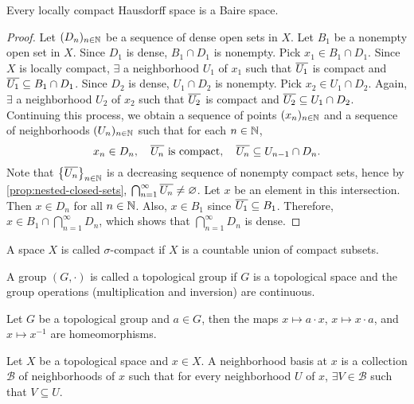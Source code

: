 \begin{thm}
    Every locally compact Hausdorff space is a Baire space.
    \begin{proof}
        Let $(D_n)_{n\in \N}$ be a sequence of dense open sets in $X$. Let $B_1$ be a nonempty open set in $X$. Since $D_1$ is dense, $B_1 \cap D_1$ is nonempty. Pick $x_1 \in B_1 \cap D_1$. Since $X$ is locally compact, $\exists$ a neighborhood $U_1$ of $x_1$ such that $\Bar{U_1}$ is compact and $\Bar{U_1} \subseteq B_1 \cap D_1$. Since $D_2$ is dense, $U_1 \cap D_2$ is nonempty. Pick $x_2 \in U_1 \cap D_2$. Again, $\exists$ a neighborhood $U_2$ of $x_2$ such that $\Bar{U_2}$ is compact and $\Bar{U_2} \subseteq U_1 \cap D_2$. Continuing this process, we obtain a sequence of points $(x_n)_{n\in \N}$ and a sequence of neighborhoods $(U_n)_{n\in \N}$ such that for each $n\in \N$,
        \[
        x_n \in D_n, \quad \Bar{U_n} \text{ is compact}, \quad \Bar{U_n} \subseteq U_{n-1} \cap D_n.
        \]
        Note that $\set{\Bar{U_n}}_{n\in \N}$ is a decreasing sequence of nonempty compact sets, hence by \ref{prop:nested-closed-sets}, $\bigcap_{n=1}^\infty \Bar{U_n} \neq \emptyset$. Let $x$ be an element in this intersection. Then $x \in D_n$ for all $n\in \N$. Also, $x \in B_1$ since $\Bar{U_1} \subseteq B_1$. Therefore, $x \in B_1 \cap \bigcap_{n=1}^\infty D_n$, which shows that $\bigcap_{n=1}^\infty D_n$ is dense.
    \end{proof}
\end{thm}

\begin{df}
    A space $X$ is called $\sigma$-compact if $X$ is a countable union of compact subsets.
\end{df}

\begin{df}
    A group $(G, \cdot)$ is called a topological group if $G$ is a topological space and the group operations (multiplication and inversion) are continuous.
\end{df}

\begin{prop}
    Let $G$ be a topological group and $a \in G$, then the maps $x \mapsto a \cdot x$, $x \mapsto x \cdot a$, and $x \mapsto x^{-1}$ are homeomorphisms.
\end{prop}

\begin{df}
    Let $X$ be a topological space and $x \in X$. A neighborhood basis at $x$ is a collection $\mathcal B$ of neighborhoods of $x$ such that for every neighborhood $U$ of $x$, $\exists V \in \mathcal B$ such that $V \subseteq U$.
\end{df}

